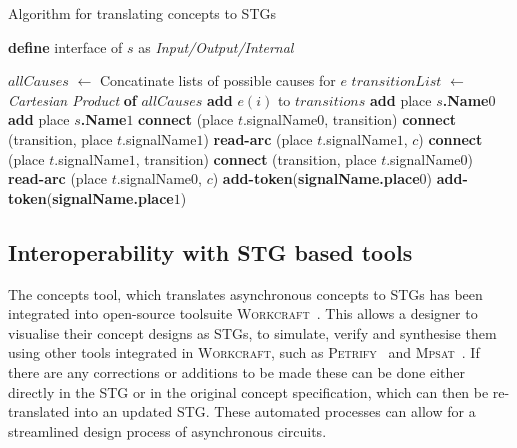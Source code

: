 \documentclass[british,conference,compsoc]{IEEEtran}
\newcommand{\noun}[1]{\textsc{#1}}
\begin{document}
\begin{algorithm}[H]
\begin{algorithmic}
\caption{Algorithm for translating concepts to STGs\label{alg:translation}}
  \State \textbf{define} interface of $s$ as \emph{Input/Output/Internal}
\EndFor

  \State $allCauses$ $\leftarrow$ Concatinate lists of possible causes for $e$
  \State $transitionList$ $\leftarrow$ \emph{Cartesian Product} \textbf{of} $allCauses$
    \State \textbf{add} $e(i)$ to $transitions$
  \EndFor 
\EndFor
{}
  \State \textbf{add} place \textbf{$s$.Name}$0$
  \State \textbf{add} place \textbf{$s$.Name}$1$
\EndFor
{}
    \State \textbf{connect} (place $t$.signalName$0$, transition)
    \State \textbf{connect} (transition, place $t$.signalName$1$)
      \State \textbf{read-arc} (place $t$.signalName$1$, $c$)
    \EndFor
  \EndIf
    \State \textbf{connect} (place $t$.signalName$1$, transition)
    \State \textbf{connect} (transition, place $t$.signalName$0$)
      \State \textbf{read-arc} (place $t$.signalName$0$, $c$)
    \EndFor
  \EndIf
\EndFor
{}
    \State \textbf{add-token}(\textbf{signalName.place}$0$)
  \EndIf 
    \State \textbf{add-token}(\textbf{signalName.place}$1$)
  \EndIf
\EndFor
\end{algorithmic}
\end{algorithm}


\subsection{Interoperability with STG based tools \label{sub:interop-with-stg}}

The concepts tool, which translates asynchronous concepts to STGs has been
integrated into open-source toolsuite \noun{Workcraft}~\cite{Workcraft_website}.
This allows a designer to visualise their concept designs as STGs, to simulate,
verify and synthesise them using other tools integrated in \noun{Workcraft},
such as \noun{Petrify}~\cite{Cortadella} and
\noun{Mpsat}~\cite{khomenko2004detecting}.
If there are any corrections or additions to be made these can be done
either directly in the STG or in the original concept specification, which can then
be re-translated into an updated STG. These automated processes can allow for a
streamlined design process of asynchronous circuits.
\end{document}
